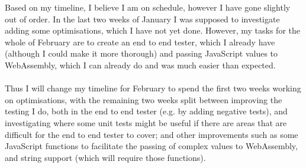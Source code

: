 \documentclass[12pt]{article}
\begin{document}
	Based on my timeline, I believe I am on schedule, however I have gone slightly out of order. In the last two weeks of January I was supposed to investigate adding some optimisations, which I have not yet done. However, my tasks for the whole of February are to create an end to end tester, which I already have (although I could make it more thorough) and passing JavaScript values to WebAssembly, which I can already do and was much easier than expected.
	\\\\
	Thus I will change my timeline for February to spend the first two weeks working on optimisations, with the remaining two weeks split between improving the testing I do, both in the end to end tester (e.g. by adding negative tests), and investigating where some unit tests might be useful if there are areas that are difficult for the end to end tester to cover; and other improvements such as some JavaScript functions to facilitate the passing of complex values to WebAssembly, and string support (which will require those functions).
	
	
\end{document}

